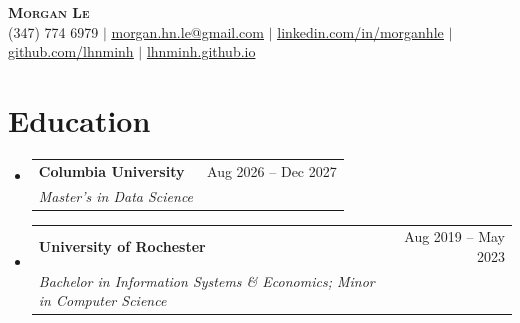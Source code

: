 \documentclass[a4paper,11pt]{article}
\makeatletter
\newcommand{\resumeSubheading}[4]{
  \vspace{-2pt}\item
    \begin{tabular*}{0.97\textwidth}[t]{l@{\extracolsep{\fill}}r}
      \textbf{#1} & #2 \\
      \textit{\small#3} & \textit{\small #4} \\
    \end{tabular*}\vspace{-7pt}
}
\newcommand{\resumeSubHeadingListStart}{\begin{itemize}[leftmargin=0.15in, label={}]}
\newcommand{\resumeSubHeadingListEnd}{\end{itemize}}
\makeatother
\begin{document}
\begin{center}
  \textbf{\Huge \scshape Morgan Le} \\ \vspace{1pt}
  \small (347) 774 6979 $|$
  \href{mailto:morgan.hn.le@gmail.com}{\underline{morgan.hn.le@gmail.com}} $|$
  \href{https://www.linkedin.com/in/morganhle/}{\underline{linkedin.com/in/morganhle}} $|$
  \href{https://github.com/lhnminh}{\underline{github.com/lhnminh}} $|$
  \href{https://lhnminh.github.io/}{lhnminh.github.io}
\end{center}

\section{Education}
\resumeSubHeadingListStart
  \resumeSubheading
    {Columbia University}{Aug 2026 -- Dec 2027}
    {Master's in Data Science}{}
  \resumeSubheading
    {University of Rochester}{Aug 2019 -- May 2023}
    {Bachelor in Information Systems \& Economics; Minor in Computer Science}{}
\resumeSubHeadingListEnd
\end{document}
